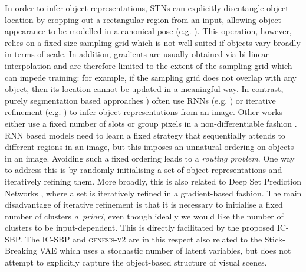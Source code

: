 \documentclass{article}
\begin{document}
In order to infer object representations, STNs \cite{jaderberg2015spatial} can explicitly disentangle object location by cropping out a rectangular region from an input, allowing object appearance to be modelled in a canonical pose (e.g. \cite{huang2015efficient,eslami2016attend,kosiorek2018sqair,xu2018multi,crawford2019spatially,lin2020space,jiang2020scalor,jiang2020generative}).
This operation, however, relies on a fixed-size sampling grid which is not well-suited if objects vary broadly in terms of scale.
In addition, gradients are usually obtained via bi-linear interpolation and are therefore limited to the extent of the sampling grid which can impede training: for example, if the sampling grid does not overlap with any object, then its location cannot be updated in a meaningful way.
In contrast, purely segmentation based approaches \cite{greff2016tagger,greff2017neural,van2018relational,burgess2019monet,greff2019multi,veerapaneni2020entity,engelcke2020genesis,engelcke2020reconstruction,locatello2020object,kosiorek2019stacked,yang2020learning,bear2020learning}) often use RNNs (e.g. \cite{burgess2019monet,engelcke2020genesis,engelcke2020reconstruction}) or iterative refinement (e.g. \cite{greff2016tagger,greff2017neural,van2018relational,greff2019multi,veerapaneni2020entity,locatello2020object}) to infer object representations from an image.
Other works either use a fixed number of slots \cite{kosiorek2019stacked,yang2020learning} or group pixels in a non-differentiable fashion \cite{bear2020learning}.
RNN based models need to learn a fixed strategy that sequentially attends to different regions in an image, but this imposes an unnatural ordering on objects in an image.
Avoiding such a fixed ordering leads to a \emph{routing problem}.
One way to address this is by randomly initialising a set of object representations and iteratively refining them.
More broadly, this is also related to Deep Set Prediction Networks \cite{zhang2019deep}, where a set is iteratively refined in a gradient-based fashion.
The main disadvantage of iterative refinement is that it is necessary to initialise a fixed number of clusters \mbox{\emph{a priori}}, even though ideally we would like the number of clusters to be input-dependent.
This is directly facilitated by the proposed IC-SBP.
The IC-SBP and \textsc{genesis-v2} are in this respect also related to the {Stick-Breaking VAE} \cite{nalisnick2016stick} which uses a stochastic number of latent variables, but does not attempt to explicitly capture the object-based structure of visual scenes.
\end{document}
